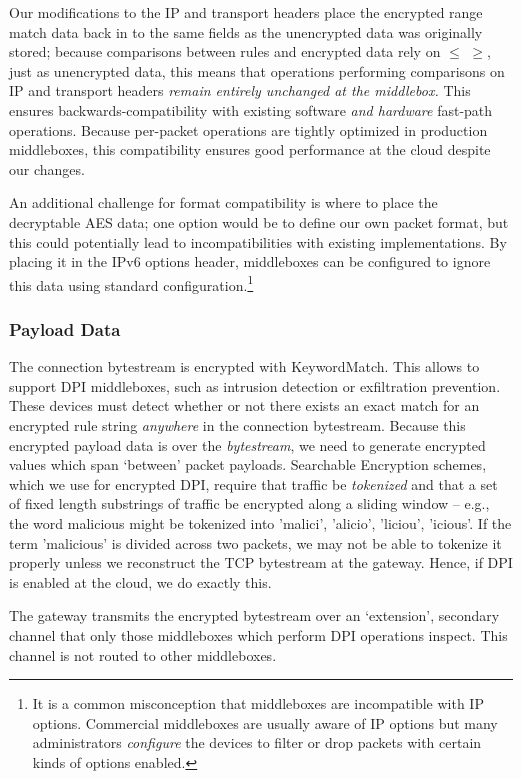 Our modifications to the IP and transport headers place the encrypted range match data back in to the same fields as the unencrypted data was originally stored; because comparisons between rules and encrypted data rely on $\leq$ $\geq$, just as unencrypted data, this means that operations performing comparisons on IP and transport headers {\it remain entirely unchanged at the middlebox.}
This ensures backwards-compatibility with existing software {\it and hardware} fast-path operations.
Because per-packet operations are tightly optimized in production middleboxes, this compatibility ensures good performance at the cloud despite our changes.

An additional challenge for format compatibility is where to place the decryptable AES data; one option would be to define our own packet format, but this could potentially lead to incompatibilities with existing implementations. By placing it in the IPv6 options header, middleboxes can be configured to ignore this data using standard configuration.\footnote{It is a common misconception that middleboxes are incompatible with IP options. Commercial middleboxes are usually aware of IP options but many administrators {\it configure} the devices to filter or drop packets with certain kinds of options enabled.}


\subsubsection{Payload Data} 
The connection bytestream is encrypted with KeywordMatch.
This allows \sys to support DPI middleboxes, such as intrusion detection or exfiltration prevention.
These devices must detect whether or not there exists an exact match for an encrypted rule string {\it anywhere} in the connection bytestream.
Because this encrypted payload data is over the {\it bytestream}, we need to generate encrypted values which span `between' packet payloads. 
Searchable Encryption schemes, which we use for encrypted DPI, require that traffic be {\it tokenized} and that a set of fixed length substrings of traffic be encrypted along a sliding window -- e.g., the word malicious might be tokenized into {'malici', 'alicio', 'liciou', 'icious'}.
If the term 'malicious' is divided across two packets, we may not be able to tokenize it properly unless we reconstruct the TCP bytestream at the gateway. Hence, if DPI is enabled at the cloud, we do exactly this.

The gateway transmits the encrypted bytestream over an `extension', secondary channel that only those middleboxes which perform DPI operations inspect. 
This channel is not routed to other middleboxes.


